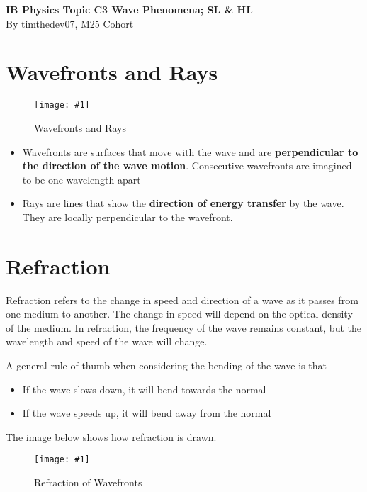 \documentclass[a4paper,12pt]{article}
\let\oldsection\section
\renewcommand\section{\clearpage\oldsection}
\newcommand{\img}[4]{\begin{center}
  \begin{figure}[H]
    \centering
    \texttt{[image: \#1]}
    \caption{#3}
    \label{fig:#4}
  \end{figure}
\end{center}}
\begin{document}
\pagestyle{fancy}


\begin{titlepage}
  \begin{center}

    \vspace*{8cm}
    \textbf{\Large {IB Physics Topic C3 Wave Phenomena; SL \& HL}} \\
    \vspace*{1cm}
    \large{By timthedev07, M25 Cohort}


  \end{center}
\end{titlepage}

\pagebreak
\tableofcontents
\pagebreak

\clearpage
\setcounter{page}{1}

\section{Wavefronts and Rays}
\img{wavefrontray.png}{0.5}{Wavefronts and Rays}{wavefrontray}
\begin{itemize}
  \item Wavefronts are surfaces that move with the wave and are \textbf{perpendicular to the direction of the wave motion}. Consecutive wavefronts are imagined to be one wavelength apart
  \item Rays are lines that show the \textbf{direction of energy transfer} by the wave. They are locally perpendicular to the wavefront.
\end{itemize}


\section{Refraction}

Refraction refers to the change in speed and direction of a wave as it passes from one medium to another. The change in speed will depend on the optical density of the medium. In refraction, the frequency of the wave remains constant, but the wavelength and speed of the wave will change.

A general rule of thumb when considering the bending of the wave is that
\begin{itemize}
  \item If the wave slows down, it will bend towards the normal
  \item If the wave speeds up, it will bend away from the normal
\end{itemize}
The image below shows how refraction is drawn.
\img{refractionwavefront.png}{0.5}{Refraction of Wavefronts}{refractionwavefront}
\end{document}
